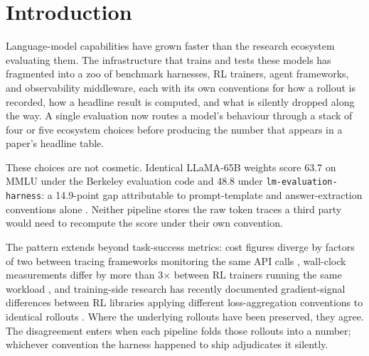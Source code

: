 \documentclass{article}
\begin{document}
\section{Introduction}
\label{sec:intro}

Language-model capabilities have grown faster than the research
ecosystem evaluating them. The infrastructure that trains and
tests these models has fragmented into a zoo of benchmark
harnesses, RL trainers, agent frameworks, and observability
middleware, each with its own conventions for how a rollout
is recorded, how a headline result is computed, and what is silently
dropped along the way. A single evaluation now routes a model's
behaviour through a stack of four or five ecosystem choices
before producing the number that appears in a paper's headline
table.

These choices are not cosmetic. Identical LLaMA-65B weights
score 63.7 on MMLU under the Berkeley evaluation code and 48.8
under \texttt{lm-evaluation-harness}: a 14.9-point gap
attributable to prompt-template and answer-extraction
conventions alone \citep{beeching2023openllm, biderman2024}.
Neither pipeline stores the raw token traces a third party
would need to recompute the score under their own convention.

The pattern extends beyond task-success metrics: cost figures
diverge by factors of two between tracing frameworks monitoring
the same API calls \citep{opentelemetry3163, langfuse12306},
wall-clock measurements differ by more than 3$\times$ between
RL trainers running the same workload \citep{hu2025openrlhf},
and training-side research has recently documented
gradient-signal differences between RL libraries applying
different loss-aggregation conventions to identical rollouts
\citep{liu2025drgrpo}. Where the underlying rollouts have been preserved, they
agree. The disagreement enters when each pipeline folds
those rollouts into a number; whichever convention the harness
happened to ship adjudicates it silently.
\end{document}
